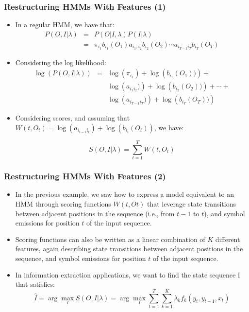 \documentclass{beamer}
\begin{document}
\begin{frame} \frametitle{Restructuring HMMs With Features (1)}
\begin{itemize}
\item In a regular HMM, we have that:
\begin{eqnarray*}
      P(O,I|\lambda) & = & P(O|I,\lambda)P(I|\lambda) \\
                     & = & \pi_{i_1}b_{i_1}(O_1)a_{i_1,i_2}b_{i_2}(O_2) \dotsb a_{i_{T-1}i_T}b_{i_T}(O_T)
\end{eqnarray*}

\item Considering the log likelihood:
\begin{eqnarray*}
\log\left(P(O,I|\lambda)\right) & = & \log\left(\pi_{i_1}\right) + \log\left(b_{i_1}(O_1))\right) + \\
                                &   &\log\left(a_{i_1i_2})\right) + \log\left(b_{i_2}(O_2))\right) + \dotsb + \\
                                &   & \log\left(a_{i_{T-1}i_T})\right) + \log\left(b_{i_T}(O_T))\right)
\end{eqnarray*}

\item Considering scores, and assuming that $W(t,O_t) = \log(a_{i_{t-1}i_t}) + \log(b_{i_{t}}(O_t))$, we have:

\begin{displaymath}
S(O,I|\lambda) = \sum_{t=1}^{T} W(t,O_t)
\end{displaymath}
\end{itemize}
\end{frame}

\begin{frame} \frametitle{Restructuring HMMs With Features (2)}
\begin{itemize}
\item In the previous example, we saw how to express a model equivalent to an HMM through scoring functions $W(t,Ot)$ that leverage state transitions between adjacent positions in the sequence (i.e., from $t-1$ to $t$), and symbol emissions for position $t$ of the input sequence.

\item Scoring functions can also be written as a linear combination of $K$ different features, again describing state transitions between adjacent positions in the sequence, and symbol emissions for position $t$ of the input sequence.

\item In information extraction applications, we want to find the state sequence I that satisfies:
{\scriptsize
\begin{displaymath}
\hat{I} = \arg \max_I S(O,I|\lambda) = \arg \max_I \sum_{t=1}^T \sum_{k=1}^K\lambda_kf_k(y_t, y_{t-1}, x_t)
\end{displaymath} }
\end{itemize}

\end{frame}
\end{document}

